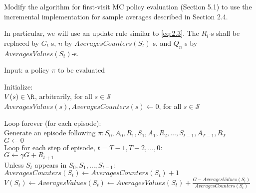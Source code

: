 
\begin{exercise}[Exercise 5.9]

Modify the algorithm for first-visit MC policy evaluation (Section 5.1) to use the incremental implementation for sample averages described in Section 2.4.

\end{exercise}


\begin{solution}

In particular, we will use an update rule similar to \eqref{eq:2.3}.
The $R_i$-s shall be replaced by $G_t$-s, $n$ by $\mathit{AveragesCounters}(S_t)$-s, and $Q_n$-s by $\mathit{AveragesValues}(S_t)$-s.

\begin{tcolorbox}[title = {First-visit MC prediction, for estimating $V \approx v_\pi$, incremental implementation}]
    Input: a policy $\pi$ to be evaluated

    Initialize: \\
    \hspace*{0.5cm} $V(s) \in \R$, arbitrarily, for all $s \in \mathcal S$ \\
    \hspace*{0.5cm} $\mathit{AveragesValues}(s), \mathit{AveragesCounters}(s) \leftarrow 0$, for all $s \in \mathcal S$

    Loop forever (for each episode): \\
    \hspace*{0.5cm} Generate an episode following $\pi: S_0, A_0, R_1, S_1, A_1, R_2, \dots, S_{t-1}, A_{T-1}, R_T$ \\
    \hspace*{0.5cm} $G \leftarrow 0$ \\
    \hspace*{0.5cm} Loop for each step of episode, $t = T-1, T-2, \dots, 0$: \\
    \hspace*{0.5cm} \hspace*{0.5cm} $G \leftarrow \gamma G + R_{t+1}$ \\
    \hspace*{0.5cm} \hspace*{0.5cm} Unless $S_t$ appears in $S_0, S_1, \dots, S_{t-1}$: \\
    \hspace*{0.5cm} \hspace*{0.5cm} \hspace*{0.5cm} $\mathit{AveragesCounters}(S_t) \leftarrow \mathit{AveragesCounters}(S_t) + 1$ \\
    \hspace*{0.5cm} \hspace*{0.5cm} \hspace*{0.5cm} $V(S_t) \leftarrow \mathit{AveragesValues}(S_t) \leftarrow \mathit{AveragesValues}(S_t) + \frac{G - \mathit{AveragesValues}(S_t)}{\mathit{AveragesCounters}(S_t)}$
\end{tcolorbox}

\end{solution}

